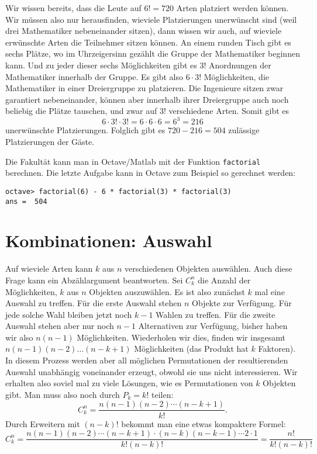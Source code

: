 \begin{beispiele}
\begin{loesung}
\begin{teilaufgaben}
Wir wissen bereits, dass die Leute auf $6!=720$ Arten platziert werden
können.
Wir müssen also nur herausfinden, wieviele Platzierungen
unerwünscht sind (weil drei Mathematiker nebeneinander sitzen),
dann wissen wir auch, auf wieviele erwünschte Arten die Teilnehmer
sitzen können.
An einem runden Tisch gibt es sechs Plätze, wo im Uhrzeigersinn gezählt 
die Gruppe der Mathematiker beginnen kann.
Und zu jeder dieser
sechs Möglichkeiten gibt es $3!$ Anordnungen der Mathematiker innerhalb
der Gruppe.
Es gibt also $6 \cdot 3!$ Möglichkeiten, die Mathematiker
in einer Dreiergruppe zu platzieren.
Die Ingenieure sitzen zwar garantiert nebeneinander, können aber
innerhalb ihrer Dreiergruppe auch noch beliebig die Plätze
tauschen, und zwar auf $3!$ verschiedene Arten.
Somit gibt es
\[
6\cdot 3!\cdot 3!=6\cdot 6\cdot 6=6^3=216
\]
unerwünschte Platzierungen.
Folglich gibt es $720-216=504$ zulässige
Platzierungen der Gäste.
\end{teilaufgaben}
\end{loesung}

\end{beispiele}

Die Fakultät kann man in Octave/Matlab mit der Funktion {\tt factorial}
berechnen.
Die letzte Aufgabe kann in Octave zum Beispiel so gerechnet
werden:
\begin{verbatim}
octave> factorial(6) - 6 * factorial(3) * factorial(3)
ans =  504
\end{verbatim}

\section{Kombinationen: Auswahl}
Auf wieviele Arten kann $k$ aus $n$ verschiedenen Objekten
auswählen.
Auch diese Frage kann ein Abzählargument
beantworten.
Sei $C^n_k$ die Anzahl der Möglichkeiten,
$k$ aus $n$ Objekten auszuwählen.
Es ist also zunächst
$k$ mal eine Auswahl zu treffen.
Für die erste Auswahl stehen $n$ Objekte zur Verfügung.
Für jede solche Wahl bleiben jetzt noch $k-1$ Wahlen zu treffen.
Für die zweite
Auswahl stehen aber nur noch $n-1$ Alternativen zur Verfügung,
bisher haben wir also $n(n-1)$ Möglichkeiten.
Wiederholen wir
dies, finden wir insgesamt $n(n-1)(n-2)\dots(n-k+1)$ Möglichkeiten
(das Produkt hat $k$ Faktoren).
In diesem Prozess werden
aber all möglichen Permutationen der resultierenden Auswahl
unabhängig voneinander erzeugt, obwohl sie uns nicht
interessieren.
Wir erhalten also soviel mal zu viele Lösungen, wie
es Permutationen von $k$ Objekten gibt.
Man muss also noch durch
$P_k=k!$ teilen:
\[
C^n_k=\frac{n(n-1)(n-2)\dotsm(n-k+1)}{k!}.
\]
Durch Erweitern mit $(n-k)!$ bekommt man eine etwas
kompaktere Formel:
\[
C^n_k=\frac{n(n-1)(n-2)\dotsm(n-k+1)\cdot(n-k)(n-k-1)\dotsm2\cdot 1}{k!(n-k)!}
=\frac{n!}{k!(n-k)!}
\]

